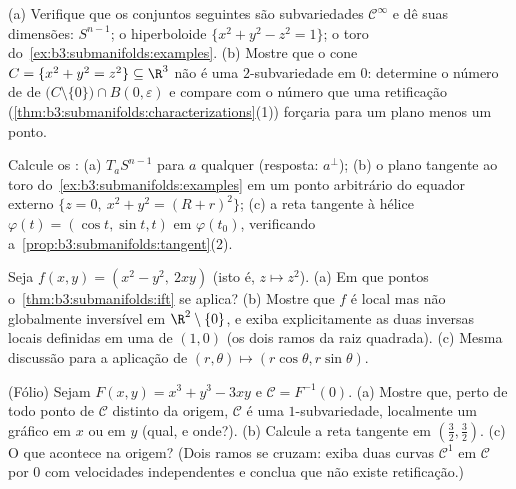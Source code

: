 \begin{exercise}[$\star$]\label{exo:b3:submanifolds:1}
(a) Verifique que os conjuntos seguintes são subvariedades $\mathcal C^\infty$ e dê
suas dimensões: $S^{n-1}$; o hiperboloide $\{x^2 + y^2 - z^2 = 1\}$; o toro do~\cref{ex:b3:submanifolds:examples}.
(b) Mostre que o cone $C = \{x^2 + y^2 = z^2\} \subseteq
\R^3$ não é uma $2$-subvariedade em $0$:
determine o número de  de $\bigl(C\setminus\{0\}\bigr)\cap B(0,\varepsilon)$ e compare com o
número que uma retificação (\cref{thm:b3:submanifolds:characterizations}(1)) forçaria para um plano
menos um ponto.
\end{exercise}

\begin{exercise}[$\star$]\label{exo:b3:submanifolds:2}
Calcule os :
(a) $T_aS^{n-1}$ para $a$ qualquer (resposta: $a^\perp$);
(b) o plano tangente ao toro do~\cref{ex:b3:submanifolds:examples} em um ponto arbitrário do
equador externo $\{z = 0,\ x^2 + y^2 = (R + r)^2\}$;
(c) a reta tangente à hélice $\varphi(t) = (\cos t,
\sin t, t)$ em $\varphi(t_0)$, verificando
a~\cref{prop:b3:submanifolds:tangent}(2).
\end{exercise}

\begin{exercise}[$\star\star$]\label{exo:b3:submanifolds:3}
Seja $f(x, y) = (x^2 - y^2,\ 2xy)$ (isto é, $z \mapsto z^2$).
(a) Em que pontos o~\cref{thm:b3:submanifolds:ift} se aplica?
(b) Mostre que $f$ é local mas não globalmente inversível em $\R^2\setminus\{0\}$, e
exiba explicitamente as duas inversas locais definidas em uma 
de $(1, 0)$ (os dois ramos da raiz quadrada).
(c) Mesma discussão para a aplicação de  $(r,
\theta) \mapsto (r\cos\theta, r\sin\theta)$.
\end{exercise}

\begin{exercise}[$\star\star$]\label{exo:b3:submanifolds:4}
(Fólio) Sejam $F(x,y) = x^3 + y^3 - 3xy$ e $\mathcal C =
F^{-1}(0)$.
(a) Mostre que, perto de todo ponto de $\mathcal C$ distinto da origem, $\mathcal C$ é
uma $1$-subvariedade, localmente um gráfico em $x$ ou em $y$
(qual, e onde?).
(b) Calcule a reta tangente em $(\frac32, \frac32)$.
(c) O que acontece na origem? (Dois ramos se cruzam: exiba duas curvas
$\mathcal C^1$ em $\mathcal C$ por $0$ com velocidades independentes e conclua que
não existe retificação.)
\end{exercise}


